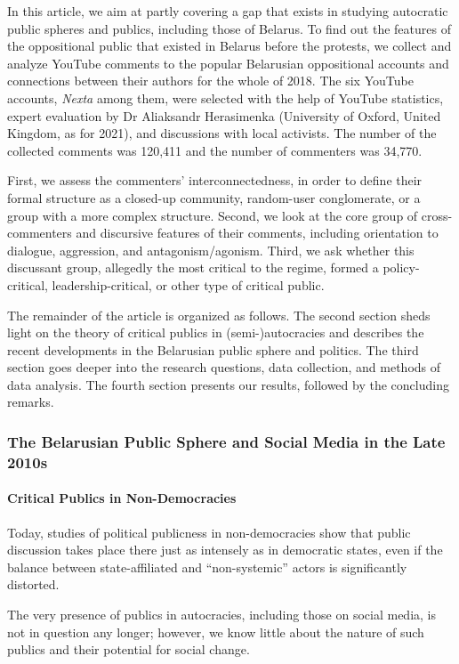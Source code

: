 In this article, we aim at partly covering a gap that exists in studying autocratic public spheres and publics, including those of Belarus. To find out the features of the oppositional public that existed in Belarus before the protests, we collect and analyze YouTube comments to the popular Belarusian oppositional accounts and connections between their authors for the whole of 2018. The six YouTube accounts, \textit{Nexta} among them, were selected with the help of YouTube statistics, expert evaluation by Dr Aliaksandr Herasimenka (University of Oxford, United Kingdom, as for 2021), and discussions with local activists. The number of the collected comments was 120,411 and the number of commenters was 34,770.

First, we assess the commenters’ interconnectedness, in order to define their formal structure as a closed-up community, random-user conglomerate, or a group with a more complex structure. Second, we look at the core group of cross-commenters and discursive features of their comments, including orientation to dialogue, aggression, and antagonism/agonism. Third, we ask whether this discussant group, allegedly the most critical to the regime, formed a policy- critical, leadership-critical, or other type of critical public.

The remainder of the article is organized as follows. The second section sheds light on the theory of critical publics in (semi-)autocracies and describes the recent developments in the Belarusian public sphere and politics. The third section goes deeper into the research questions, data collection, and methods of data analysis. The fourth section presents our results, followed by the concluding remarks.

\subsubsection{The Belarusian Public Sphere and Social Media in the Late 2010s}

\paragraph{Critical Publics in Non-Democracies}
Today, studies of political publicness in non-democracies \cite{GurievTreisman,StockmannLuoShen} show that public discussion takes place there just as intensely as in democratic states, even if the balance between state-affiliated and “non-systemic” actors is significantly distorted.

The very presence of publics in autocracies, including those on social media, is not in question any longer; however, we know little about the nature of such publics and their potential for social change.

